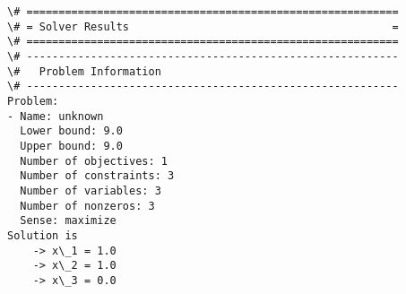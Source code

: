 \documentclass{article}
\newcommand*{\1}{\mathbf{1}}
\begin{document}
    \begin{Verbatim}[commandchars=\\\{\}]
\# ==========================================================
\# = Solver Results                                         =
\# ==========================================================
\# ----------------------------------------------------------
\#   Problem Information
\# ----------------------------------------------------------
Problem:
- Name: unknown
  Lower bound: 9.0
  Upper bound: 9.0
  Number of objectives: 1
  Number of constraints: 3
  Number of variables: 3
  Number of nonzeros: 3
  Sense: maximize
Solution is
    -> x\_1 = 1.0
    -> x\_2 = 1.0
    -> x\_3 = 0.0
    \end{Verbatim}
\end{document}

